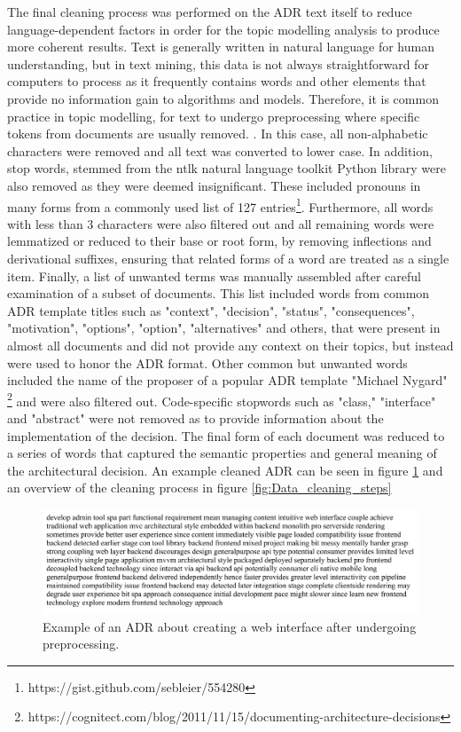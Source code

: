         The final cleaning process was performed on the ADR text itself to reduce language-dependent factors in order for the topic modelling analysis to produce more coherent results. Text is generally written in natural language for human understanding, but in text mining, this data is not always straightforward for computers to process as it frequently contains words and other elements that provide no information gain to algorithms and models. Therefore, it is common practice in topic modelling, for text to undergo preprocessing where specific tokens from documents are usually removed. \cite{topic-modelling-text-cleaning, text-mining-lda}. In this case, all non-alphabetic characters were removed and all text was converted to lower case. In addition, stop words, stemmed from the ntlk natural language toolkit Python library were also removed as they were deemed insignificant. These included pronouns in many forms from a commonly used list of 127 entries\footnote{https://gist.github.com/sebleier/554280}. Furthermore, all words with less than 3 characters were also filtered out and all remaining words were lemmatized or reduced to their base or root form, by removing inflections and derivational suffixes, ensuring that related forms of a word are treated as a single item. Finally, a list of unwanted terms was manually assembled after careful examination of a subset of documents. This list included words from common ADR template titles such as "context", "decision", "status", "consequences", "motivation", "options", "option", "alternatives" and others, that were present in almost all documents and did not provide any context on their topics, but instead were used to honor the ADR format. Other common but unwanted words included the name of the proposer of a popular ADR template "Michael Nygard" \footnote{https://cognitect.com/blog/2011/11/15/documenting-architecture-decisions} and were also filtered out. Code-specific stopwords such as "class," "interface" and "abstract" were not removed as to provide information about the implementation of the decision. The final form of each document was reduced to a series of words that captured the semantic properties and general meaning of the architectural decision. An example cleaned ADR can be seen in figure \ref{fig:Cleaned_ADR} and an overview of the cleaning process in figure \ref{fig:Data_cleaning_steps}
        
        \begin{figure}[]
            \centering
            \includegraphics[scale=0.6]{figures/adr_cleaned_example.jpeg}
            \caption{Example of an ADR about creating a web interface after undergoing preprocessing.}
            \label{fig:Cleaned_ADR}
        \end{figure}

